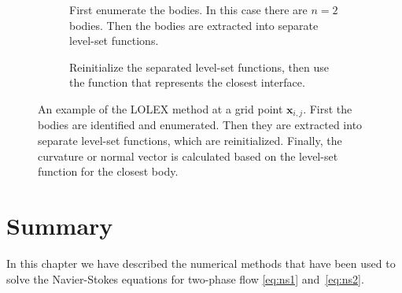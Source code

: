\documentclass[11pt,b5paper,DIV=calc,BCOR1.3cm,headings=small,%
               footinclude=false,headsepline]{scrbook}
\newcommand*{\vct}[1]{\ensuremath{\boldsymbol{#1}}}
\begin{document}
\begin{figure}[tbp]
  \centering
  \begin{subfigure}[t]{0.49\textwidth}
    \centering
    \caption{First enumerate the bodies.  In this case there are $n=2$ bodies.
      Then the bodies are extracted into separate level-set functions.}
  \end{subfigure}
  \begin{subfigure}[t]{0.49\textwidth}
    \centering
    \caption{Reinitialize the separated level-set functions, then use the
      function that represents the closest interface.}
  \end{subfigure}
  \caption{An example of the LOLEX method at a grid point $\vct x_{i,j}$.
    First the bodies are identified and enumerated.  Then they are extracted
    into separate level-set functions, which are reinitialized.  Finally, the
    curvature or normal vector is calculated based on the level-set function
    for the closest body.}
  \label{fig:lolex}
\end{figure}

\section{Summary}
In this chapter we have described the numerical methods that have been used to
solve the Navier-Stokes equations for two-phase flow \eqref{eq:ns1}
and~\eqref{eq:ns2}.
\end{document}
